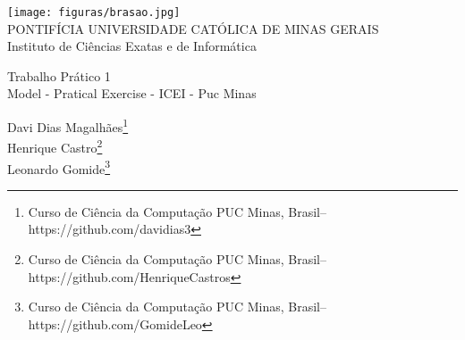 \documentclass[a4paper,12pt,Times]{article}
\newcommand{\monog}{Trabalho Prático 1}
\newcommand{\monogES}{Model - Pratical Exercise - ICEI - Puc Minas}
\newcommand{\origem}{Brasil}
\newcommand{\AutorA}{Davi Dias Magalhães}
\newcommand{\emailA}{https://github.com/davidias3}
\newcommand{\cursA}{Curso de Ciência da Computação PUC Minas}
\newcommand{\AutorB}{Henrique Castro}
\newcommand{\emailB}{https://github.com/HenriqueCastros}
\newcommand{\cursB}{Curso de Ciência da Computação PUC Minas}
\newcommand{\AutorC}{Leonardo Gomide}
\newcommand{\emailC}{https://github.com/GomideLeo}
\newcommand{\cursC}{Curso de Ciência da Computação PUC Minas}
\newcommand{\keyword}[1]{\textsf{#1}}
\begin{document}
\begin{flushleft}

\begin{center}
\texttt{[image: figuras/brasao.jpg]} \\
PONTIFÍCIA UNIVERSIDADE CATÓLICA DE MINAS GERAIS \\
Instituto de Ciências Exatas e de Informática

 \vspace{1.0cm}

\end{center}

 \vspace{0cm} {
\singlespacing \Large{\monog {} \\ }
  \normalsize{\monogES}
 }
\end{flushleft}
\begin{flushright}
\singlespacing 
\normalsize{\AutorA \footnote{\funcaoA \cursA, \origem -- \emailA }} \\
\normalsize{\AutorB \footnote{\funcaoB \cursB, \origem -- \emailB }} \\
\normalsize{\AutorC \footnote{\funcaoC \cursC, \origem -- \emailC }} \\

\end{flushright}
\thispagestyle{empty}

\begin{abstract}
\noindent
Este exercício prático contem a documentação do Trabalho Prático I, feita em \LaTeX. O problema dos K-centros representa uma tarefa clássica da análise de dados sendo sua solução relacionada às
técnicas de clustering. Essa tarefa lida com a questão de se particionar elementos em conjuntos de acordo com suas (dis)similaridades. A principal diferença entre essas variantes é o critério utilizado para se determinar a solução ótima.\\ Neste trabalho foram implementadas e comparadas duas formas distintas para resolução do problema dos k-centros. Uma delas garantidamente encontra a melhor resposta, porem não é eficiente. E a outra encontra rapidamente uma aproximação da resposta entretanto não necessariamente será a resposta exata. As implementações foram testadas com as instâncias disponíveis para OR-Library. 





\\\textbf{\keyword{Palavras-chave: }}\LaTeX. Exercício Prático. Java.
\end{abstract}
\end{document}
